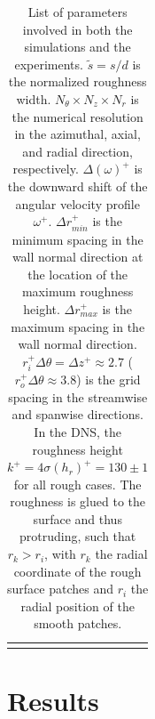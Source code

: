 \begin{landscape}
\begin{table}
\begin{tabular}{ccccc|ccc|ccccccccc}
\multicolumn{8}{c}{} \\
\end{tabular}
\caption{List of parameters involved in both the simulations and the experiments. $\tilde{s}=s/d$ is the normalized roughness width. $N_\theta\times N_z \times N_r$ is the numerical resolution in the azimuthal, axial, and radial direction, respectively. $\Delta (\omega)^+$ is the downward shift of the angular velocity profile $\omega^+$. $\Delta r_{min}^+$ is the minimum spacing in the wall normal direction at the location of the maximum roughness height. $\Delta r_{max}^+$ is the maximum spacing in the wall normal direction. $r_i^+ \Delta \theta = \Delta z^+ \approx 2.7$ ($r_o^+ \Delta \theta \approx 3.8$) is the grid spacing in the streamwise and spanwise directions. In the DNS, the roughness height $k^+ = 4\sigma(h_r)^+ = 130 \pm 1$ for all rough cases. The roughness is glued to the surface and thus protruding, such that $r_k > r_i$, with $r_k$ the radial coordinate of the rough surface patches and $r_i$ the radial position of the smooth patches.}
\label{sim_param}
\end{table}
\ifdefined\thesissections
\end{landscape}
\fi

\section{Results}\label{sec:spanwiseresults}
